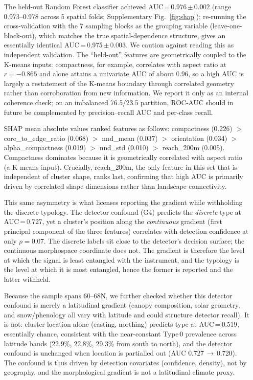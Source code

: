 \documentclass[twocolumn]{article}
\begin{document}
The held-out Random Forest classifier achieved AUC\,=\,0.976\,$\pm$\,0.002
(range 0.973--0.978 across 5 spatial folds; Supplementary Fig.~\ref{fig:shap}); re-running the cross-validation
with the 7 sampling blocks as the grouping variable (leave-one-block-out), which matches the true
spatial-dependence structure, gives an essentially identical AUC\,=\,0.975\,$\pm$\,0.003. We caution
against reading this as independent validation. The ``held-out'' features are geometrically coupled to the
K-means inputs: compactness, for example, correlates with aspect ratio at $r = -0.865$ and alone
attains a univariate AUC of about 0.96, so a high AUC is largely a restatement of the K-means
boundary through correlated geometry rather than corroboration from new information. We report it
only as an internal coherence check; on an imbalanced 76.5/23.5 partition, ROC-AUC should in
future be complemented by precision--recall AUC and per-class recall.

SHAP mean absolute values ranked features as follows:
compactness (0.226) $>$ core\_to\_edge\_ratio (0.068) $>$ nnd\_mean (0.037)
$>$ orientation (0.034) $>$ alpha\_compactness (0.019) $>$ nnd\_std (0.010)
$>$ reach\_200m (0.005).
Compactness dominates because it is geometrically correlated with aspect ratio
(a K-means input). Crucially, reach\_200m, the only feature in this set that is
independent of cluster shape, ranks last, confirming that high AUC is primarily
driven by correlated shape dimensions rather than landscape connectivity.

This same asymmetry is what licenses reporting the gradient while withholding the discrete
typology. The detector confound (G4) predicts the \emph{discrete} type at AUC\,=\,0.727, yet a
cluster's position along the \emph{continuous} gradient (first principal component of the three
features) correlates with detection confidence at only $\rho = 0.07$. The discrete labels sit
close to the detector's decision surface; the continuous morphospace coordinate does not. The
gradient is therefore the level at which the signal is least entangled with the instrument, and
the typology is the level at which it is most entangled, hence the former is reported and the
latter withheld.

Because the sample spans 60--68\textdegree{}N, we further checked whether this detector confound is
merely a latitudinal gradient (canopy composition, solar geometry, and snow/phenology all vary with
latitude and could structure detector recall). It is not: cluster location alone (easting, northing)
predicts type at AUC\,=\,0.519, essentially chance, consistent with the near-constant Type\,0
prevalence across latitude bands (22.9\%, 22.8\%, 29.3\% from south to north), and the detector
confound is unchanged when location is partialled out (AUC 0.727\,$\to$\,0.720). The confound is thus
driven by detection covariates (confidence, density), not by geography, and the morphological
gradient is not a latitudinal climate proxy.
\end{document}
